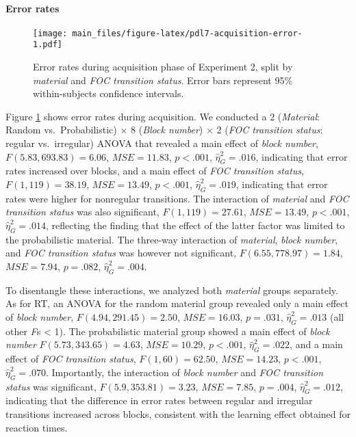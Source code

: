 \documentclass[man]{apa6}
\theoremstyle{definition}
\theoremstyle{definition}
\theoremstyle{definition}
\theoremstyle{remark}
\begin{document}
\paragraph{Error rates}\label{error-rates-1}

\begin{figure}
\centering
\texttt{[image: main\_files/figure-latex/pdl7-acquisition-error-1.pdf]}
\caption{\label{fig:pdl7-acquisition-error}Error rates during acquisition
phase of Experiment 2, split by \emph{material} and \emph{FOC transition
status}. Error bars represent 95\% within-subjects confidence
intervals.}
\end{figure}

Figure \ref{fig:pdl7-acquisition-error} shows error rates during
acquisition. We conducted a 2 (\emph{Material}: Random
vs.~Probabilistic) \(\times\) 8 (\emph{Block number}) \(\times\) 2
(\emph{FOC transition status}: regular vs.~irregular) ANOVA that
revealed a main effect of \emph{block number},
\(F(5.83, 693.83) = 6.06\), \(\mathit{MSE} = 11.83\), \(p < .001\),
\(\hat{\eta}^2_G = .016\), indicating that error rates increased over
blocks, and a main effect of \emph{FOC transition status},
\(F(1, 119) = 38.19\), \(\mathit{MSE} = 13.49\), \(p < .001\),
\(\hat{\eta}^2_G = .019\), indicating that error rates were higher for
nonregular transitions. The interaction of \emph{material} and \emph{FOC
transition status} was also significant, \(F(1, 119) = 27.61\),
\(\mathit{MSE} = 13.49\), \(p < .001\), \(\hat{\eta}^2_G = .014\),
reflecting the finding that the effect of the latter factor was limited
to the probabilistic material. The three-way interaction of
\emph{material}, \emph{block number}, and \emph{FOC transition status}
was however not significant, \(F(6.55, 778.97) = 1.84\),
\(\mathit{MSE} = 7.94\), \(p = .082\), \(\hat{\eta}^2_G = .004\).

To disentangle these interactions, we analyzed both \emph{material}
groups separately. As for RT, an ANOVA for the random material group
revealed only a main effect of \emph{block number},
\(F(4.94, 291.45) = 2.50\), \(\mathit{MSE} = 16.03\), \(p = .031\),
\(\hat{\eta}^2_G = .013\) (all other \emph{F}s \textless{} 1). The
probabilistic material group showed a main effect of \emph{block number}
\(F(5.73, 343.65) = 4.63\), \(\mathit{MSE} = 10.29\), \(p < .001\),
\(\hat{\eta}^2_G = .022\), and a main effect of \emph{FOC transition
status}, \(F(1, 60) = 62.50\), \(\mathit{MSE} = 14.23\), \(p < .001\),
\(\hat{\eta}^2_G = .070\). Importantly, the interaction of \emph{block
number} and \emph{FOC transition status} was significant,
\(F(5.9, 353.81) = 3.23\), \(\mathit{MSE} = 7.85\), \(p = .004\),
\(\hat{\eta}^2_G = .012\), indicating that the difference in error rates
between regular and irregular transitions increased across blocks,
consistent with the learning effect obtained for reaction times.
\end{document}
